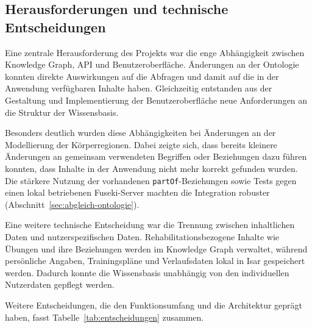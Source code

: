 \subsection{Herausforderungen und technische Entscheidungen}

Eine zentrale Herausforderung des Projekts war die enge Abhängigkeit zwischen Knowledge Graph, API und Benutzeroberfläche. Änderungen an der Ontologie konnten direkte Auswirkungen auf die Abfragen und damit auf die in der Anwendung verfügbaren Inhalte haben. Gleichzeitig entstanden aus der Gestaltung und Implementierung der Benutzeroberfläche neue Anforderungen an die Struktur der Wissensbasis.

Besonders deutlich wurden diese Abhängigkeiten bei Änderungen an der Modellierung der Körperregionen. Dabei zeigte sich, dass bereits kleinere Änderungen an gemeinsam verwendeten Begriffen oder Beziehungen dazu führen konnten, dass Inhalte in der Anwendung nicht mehr korrekt gefunden wurden. Die stärkere Nutzung der vorhandenen \texttt{partOf}-Beziehungen sowie Tests gegen einen lokal betriebenen Fuseki-Server machten die Integration robuster (Abschnitt~\ref{sec:abgleich-ontologie}).

Eine weitere technische Entscheidung war die Trennung zwischen inhaltlichen Daten und nutzerspezifischen Daten. Rehabilitationsbezogene Inhalte wie Übungen und ihre Beziehungen werden im Knowledge Graph verwaltet, während persönliche Angaben, Trainingspläne und Verlaufsdaten lokal in Isar gespeichert werden. Dadurch konnte die Wissensbasis unabhängig von den individuellen Nutzerdaten gepflegt werden.

Weitere Entscheidungen, die den Funktionsumfang und die Architektur geprägt haben, fasst Tabelle~\ref{tab:entscheidungen} zusammen.

